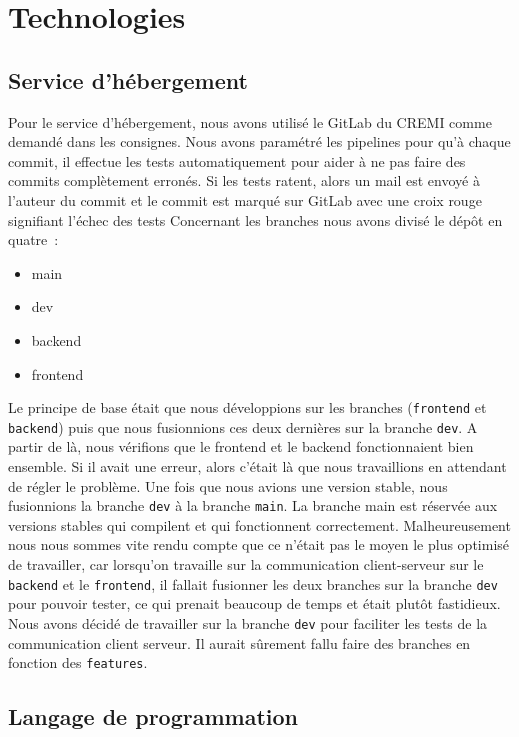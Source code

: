 

\section{Technologies}

\subsection{Service d'hébergement}

Pour le service d'hébergement, nous avons utilisé le GitLab du CREMI comme demandé dans les consignes. Nous avons paramétré les pipelines pour qu'à chaque commit, il effectue les tests automatiquement pour aider à ne pas faire des commits complètement erronés.
Si les tests ratent, alors un mail est envoyé à l'auteur du commit et le commit est marqué sur GitLab avec une croix rouge signifiant l'échec des tests Concernant les branches nous avons divisé le dépôt en quatre :
\begin{itemize}
    \item main
    \item dev
    \item backend
    \item frontend
\end{itemize}

Le principe de base était que nous développions sur les branches (\lstinline{frontend} et \lstinline{backend}) puis que nous fusionnions ces deux dernières sur la branche \lstinline{dev}. A partir de là, nous vérifions que le frontend et le backend fonctionnaient bien ensemble. Si il avait une erreur, alors c'était là que nous travaillions en attendant de régler le problème. Une fois que nous avions une version stable, nous fusionnions la branche \lstinline{dev} à la branche \lstinline{main}. La branche main est réservée aux versions stables qui compilent et qui fonctionnent correctement. Malheureusement nous nous sommes vite rendu compte que ce n'était pas le moyen le plus optimisé de travailler, car lorsqu'on travaille sur la communication client-serveur sur le \lstinline{backend} et le \lstinline{frontend}, il fallait fusionner les deux branches sur la branche \lstinline{dev} pour pouvoir tester, ce qui prenait beaucoup de temps et était plutôt fastidieux. Nous avons décidé de travailler sur la branche \lstinline{dev} pour faciliter les tests de la communication client serveur. Il aurait sûrement fallu faire des branches en fonction des {\tt features}.

\subsection{Langage de programmation}

